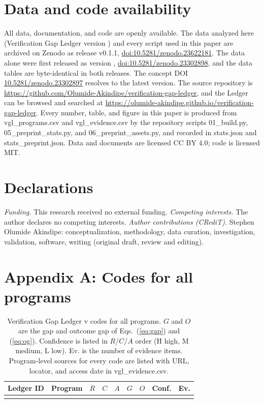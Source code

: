 \documentclass[10pt,twocolumn,letterpaper]{article}
\renewcommand{\thetable}{\Roman{table}}
\begin{document}
\section*{Data and code availability}

All data, documentation, and code are openly available. The data analyzed here (Verification Gap Ledger version \vglVersion) and every script used in this paper are archived on Zenodo as release v0.1.1, \href{https://doi.org/10.5281/zenodo.23622181}{doi:10.5281/zenodo.23622181}. The data alone were first released as version \vglVersion, \href{https://doi.org/10.5281/zenodo.23302898}{doi:10.5281/zenodo.23302898}, and the data tables are byte-identical in both releases. The concept DOI \href{https://doi.org/10.5281/zenodo.23302897}{10.5281/zenodo.23302897} resolves to the latest version. The source repository is \url{https://github.com/Olumide-Akindipe/verification-gap-ledger}, and the Ledger can be browsed and searched at \url{https://olumide-akindipe.github.io/verification-gap-ledger}. Every number, table, and figure in this paper is produced from vgl\_programs.csv and vgl\_evidence.csv by the repository scripts 01\_build.py, 05\_preprint\_stats.py, and 06\_preprint\_assets.py, and recorded in stats.json and stats\_preprint.json. Data and documents are licensed CC BY 4.0; code is licensed MIT.

\section*{Declarations}

\textit{Funding.} This research received no external funding. \textit{Competing interests.} The author declares no competing interests. \textit{Author contributions (CRediT).} Stephen Olumide Akindipe: conceptualization, methodology, data curation, investigation, validation, software, writing (original draft, review and editing).




\appendix
\renewcommand{\thetable}{A\arabic{table}}
\setcounter{table}{0}
\onecolumn
\section*{Appendix A: Codes for all programs}

\begin{table}[h]
\caption{Verification Gap Ledger v\vglVersion{} codes for all \nProg{} programs. $G$ and $O$ are the gap and outcome gap of Eqs.~(\ref{eq:gap}) and (\ref{eq:og}). Confidence is listed in $R$/$C$/$A$ order (H high, M medium, L low). Ev. is the number of evidence items. Program-level sources for every code are listed with URL, locator, and access date in vgl\_evidence.csv.}
\label{tab:appendix}
\footnotesize
\begin{tabular}{l L{8.6cm} ccccc c c}
\toprule
Ledger ID & Program & $R$ & $C$ & $A$ & $G$ & $O$ & Conf. & Ev. \\
\midrule
{}
\bottomrule
\end{tabular}
\end{table}
\end{document}
